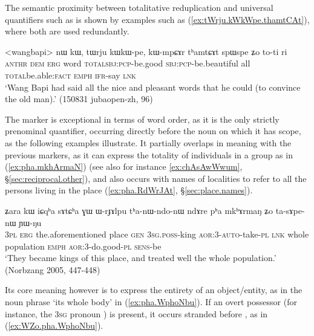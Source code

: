 The semantic proximity between totalitative reduplication and universal quantifiers such as  is shown by examples such as (\ref{ex:tWrju.kWkWpe.thamtCAt}), where both are used redundantly.

\begin{exe}
\ex \label{ex:tWrju.kWkWpe.thamtCAt}
\gll   <wangbapi> nɯ kɯ, tɯrju kɯ\redp{}kɯ-pe, kɯ-mpɕɤr tʰamtɕɤt spɯ\redp{}spe ʑo to-ti ri \\
\textsc{anthr} \textsc{dem} \textsc{erg} word \textsc{total}\redp{}\textsc{sbj}:\textsc{pcp}-be.good \textsc{sbj}:\textsc{pcp}-be.beautiful all \textsc{total}\redp{}be.able:\textsc{fact} \textsc{emph} \textsc{ifr}-say \textsc{lnk} \\
\glt `Wang Bapi had said all the nice and pleasant words that he could (to convince the old man).' (150831 jubaopen-zh, 96)
\end{exe}

The marker  is exceptional in terms of word order, as it is the only strictly prenominal quantifier, occurring directly before the noun on which it has scope, as the following examples illustrate. It partially overlaps in meaning with the previous markers, as it can express the totality of individuals in a group as in (\ref{ex:pha.mkhArmaN}) (see also for instance \ref{ex:chAsAwWwum}, §\ref{sec:reciprocal.other}), and also occurs with names of localities to refer to all the persons living in the place (\ref{ex:pha.RdWrJAt}, §\ref{sec:place.names}).

 \begin{exe}
\ex \label{ex:pha.mkhArmaN}
\gll ʑara kɯ iɕqʰa sɤtɕʰa ɣɯ ɯ-rɟɤlpu tʰa-nɯ-ndo-nɯ ndɤre pʰa mkʰɤrmaŋ ʑo ta-sɤpe-nɯ ɲɯ-ŋu \\
\textsc{3pl} \textsc{erg} the.aforementioned place  \textsc{gen} \textsc{3sg}.\textsc{poss}-king \textsc{aor}:3\flobv{}-\textsc{auto}-take-\textsc{pl} \textsc{lnk} whole population \textsc{emph} \textsc{aor}:3\flobv{}-do.good-\textsc{pl} \textsc{sens}-be \\
\glt `They became kings of this place, and treated well the whole population.' (Norbzang 2005, 447-448)
  \end{exe}
  
Its core meaning however is to express the entirety of an object/entity, as in the noun phrase   `its whole body' in (\ref{ex:pha.WphoNbu}). If an overt possessor (for instance, the \textsc{3sg} pronoun ) is present, it occurs stranded before , as in (\ref{ex:WZo.pha.WphoNbu}).

